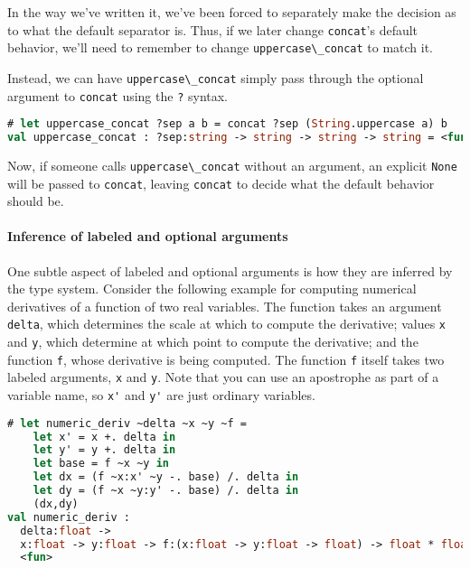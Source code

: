In the way we've written it, we've been forced to separately make the
decision as to what the default separator is. Thus, if we later change
\passthrough{\lstinline!concat!}'s default behavior, we'll need to
remember to change \passthrough{\lstinline!uppercase\_concat!} to match
it.

Instead, we can have \passthrough{\lstinline!uppercase\_concat!} simply
pass through the optional argument to \passthrough{\lstinline!concat!}
using the \passthrough{\lstinline!?!} syntax.

\begin{lstlisting}[language=Caml]
# let uppercase_concat ?sep a b = concat ?sep (String.uppercase a) b
val uppercase_concat : ?sep:string -> string -> string -> string = <fun>
\end{lstlisting}

Now, if someone calls \passthrough{\lstinline!uppercase\_concat!}
without an argument, an explicit \passthrough{\lstinline!None!} will be
passed to \passthrough{\lstinline!concat!}, leaving
\passthrough{\lstinline!concat!} to decide what the default behavior
should be.

\hypertarget{inference-of-labeled-and-optional-arguments}{%
\paragraph{Inference of labeled and optional
arguments}\label{inference-of-labeled-and-optional-arguments}}

One subtle aspect of labeled and optional arguments is how they are
inferred by the type system. Consider the following example for
computing numerical derivatives of a function of two real variables. The
function takes an argument \passthrough{\lstinline!delta!}, which
determines the scale at which to compute the derivative; values
\passthrough{\lstinline!x!} and \passthrough{\lstinline!y!}, which
determine at which point to compute the derivative; and the function
\passthrough{\lstinline!f!}, whose derivative is being computed. The
function \passthrough{\lstinline!f!} itself takes two labeled arguments,
\passthrough{\lstinline!x!} and \passthrough{\lstinline!y!}. Note that
you can use an apostrophe as part of a variable name, so
\passthrough{\lstinline!x'!} and \passthrough{\lstinline!y'!} are just
ordinary variables.

\begin{lstlisting}[language=Caml]
# let numeric_deriv ~delta ~x ~y ~f =
    let x' = x +. delta in
    let y' = y +. delta in
    let base = f ~x ~y in
    let dx = (f ~x:x' ~y -. base) /. delta in
    let dy = (f ~x ~y:y' -. base) /. delta in
    (dx,dy)
val numeric_deriv :
  delta:float ->
  x:float -> y:float -> f:(x:float -> y:float -> float) -> float * float =
  <fun>
\end{lstlisting}

